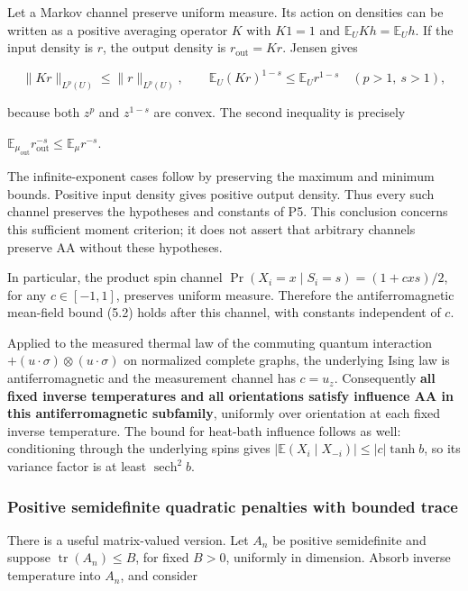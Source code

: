 Let a Markov channel preserve uniform measure. Its action on densities
can be written as a positive averaging operator \(K\) with \(K1=1\) and
\(\mathbb{E}_U Kh=\mathbb{E}_Uh\). If the input density is \(r\), the
output density is \(r_{\mathrm{out}}=Kr\). Jensen gives

\[
\|Kr\|_{L^p(U)}\le\|r\|_{L^p(U)},
\qquad \mathbb{E}_U(Kr)^{1-s}\le \mathbb{E}_Ur^{1-s}
\quad(p>1,\ s>1),
\]

because both \(z^p\) and \(z^{1-s}\) are convex. The second inequality
is precisely

\(\mathbb{E}_{\mu _{\mathrm{out}}} r_{\mathrm{out}}^{-s} \le  \mathbb{E}_\mu  r^{-s}\).

The infinite-exponent cases follow by preserving the maximum and minimum
bounds. Positive input density gives positive output density. Thus every
such channel preserves the hypotheses and constants of P5. This
conclusion concerns this sufficient moment criterion; it does not assert
that arbitrary channels preserve AA without these hypotheses.

In particular, the product spin channel \(\Pr (X_i=x\mid S_i=s)=(1+cxs)/2\),
for any \(c \in [-1,1]\), preserves uniform measure. Therefore the
antiferromagnetic mean-field bound (5.2) holds after this channel, with
constants independent of \(c\).

Applied to the measured thermal law of the commuting quantum interaction
\(+(u\cdot \sigma )\otimes (u\cdot \sigma )\) on normalized complete
graphs, the underlying Ising law is antiferromagnetic and the
measurement channel has \(c=u_z\). Consequently \textbf{all fixed
inverse temperatures and all orientations satisfy influence AA in this
antiferromagnetic subfamily}, uniformly over orientation at each fixed
inverse temperature. The bound for heat-bath influence follows as well:
conditioning through the underlying spins gives
\(|\mathbb{E}(X_i\mid X_{-i})|\le |c|\tanh  b\), so its variance factor is at
least \(\operatorname{sech}^2 b\).

\subsubsection{Positive semidefinite quadratic penalties with bounded
trace}\label{proof:positive_structure:positive-semidefinite-quadratic-penalties-with-bounded-trace}

There is a useful matrix-valued version. Let \(A_n\) be positive
semidefinite and suppose \(\operatorname{tr}(A_n)\le B\), for fixed
\(B>0\), uniformly in dimension. Absorb inverse temperature into
\(A_n\), and consider

